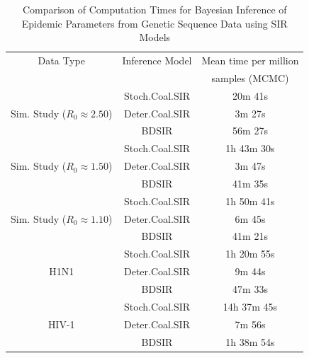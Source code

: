 \documentclass[10pt]{article}
\begin{document}
%
%
\begin{table}[!ht]
\begin{center}
\caption{\large{Comparison of Computation Times for Bayesian Inference of Epidemic Parameters from Genetic Sequence Data using SIR Models}}
\vspace{3mm}
\label{table:compTime}
\begin{tabular}{|c|c|c|}
\hline
Data Type & Inference Model & Mean time per million \\ 
 &  &  samples (MCMC) \\ 
	\hline
& Stoch.Coal.SIR & 20m 41s \\
Sim. Study ($R_{0} \approx 2.50$) & Deter.Coal.SIR & 3m 27s \\
& BDSIR & 56m 27s \\
   \hline 
& Stoch.Coal.SIR & 1h 43m 30s \\
Sim. Study ($R_{0} \approx 1.50$) & Deter.Coal.SIR & 3m 47s \\
& BDSIR & 41m 35s \\
   \hline
& Stoch.Coal.SIR & 1h 50m 41s \\
Sim. Study ($R_{0} \approx 1.10$) & Deter.Coal.SIR & 6m 45s \\
& BDSIR & 41m 21s \\
   \hline
& Stoch.Coal.SIR & 1h 20m 55s \\
H1N1 & Deter.Coal.SIR & 9m 44s \\
& BDSIR & 47m 33s \\
   \hline
& Stoch.Coal.SIR & 14h 37m 45s \\
HIV-1 & Deter.Coal.SIR & 7m 56s \\
& BDSIR & 1h 38m 54s \\
   \hline
\end{tabular}
\end{center}
\end{table}
%
%
\end{document}

